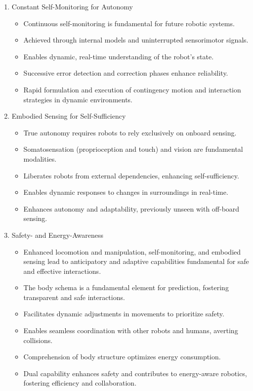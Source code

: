 \documentclass[12pt, a4paper]{article}
\begin{document}
\begin{enumerate}
\begin{itemize}
	\end{itemize}
	\item Constant Self-Monitoring for Autonomy
	\begin{itemize}
		\item Continuous self-monitoring is fundamental for future robotic systems.
		\item Achieved through internal models and uninterrupted sensorimotor signals.
		\item Enables dynamic, real-time understanding of the robot's state.
		\item Successive error detection and correction phases enhance reliability.
		\item Rapid formulation and execution of contingency motion and interaction strategies in dynamic environments.
	\end{itemize}
	\item Embodied Sensing for Self-Sufficiency 
	\begin{itemize}
		\item True autonomy requires robots to rely exclusively on onboard sensing.
		\item Somatosensation (proprioception and touch) and vision are fundamental modalities.
		\item Liberates robots from external dependencies, enhancing self-sufficiency.
		\item Enables dynamic responses to changes in surroundings in real-time.
		\item Enhances autonomy and adaptability, previously unseen with off-board sensing.
	\end{itemize}
	\item Safety- and Energy-Awareness
	\begin{itemize}
		\item Enhanced locomotion and manipulation, self-monitoring, and embodied sensing lead to anticipatory and adaptive capabilities fundamental for safe and effective interactions.
		\item The body schema is a fundamental element for prediction, fostering transparent and safe interactions.
		\item Facilitates dynamic adjustments in movements to prioritize safety.
		\item Enables seamless coordination with other robots and humans, averting collisions.
		\item Comprehension of body structure optimizes energy consumption.
		\item Dual capability enhances safety and contributes to energy-aware robotics, fostering efficiency and collaboration.
	\end{itemize}
\end{enumerate}
\end{document}

